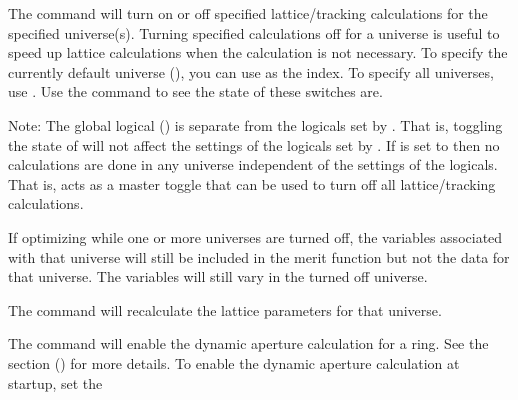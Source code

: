 {{{{{The  command will turn on or off specified lattice/tracking
calculations for the specified universe(s). Turning specified calculations off for a universe is
useful to speed up lattice calculations when the calculation is not necessary. To specify the
currently default universe (), you can use  as the 
index. To specify all universes, use \vn{*}. Use the  command to see the state of
these switches are.

Note: The global logical  () is separate from the logicals set
by . That is, toggling the state of  will not affect the
settings of the logicals set by . If  is set to  then
no calculations are done in any universe independent of the settings of the 
logicals. That is,  acts as a master toggle that can be used to turn off all
lattice/tracking calculations.

If optimizing while one or more universes are turned off, the variables associated with
that universe will still be included in the merit function but not the data for that
universe. The variables will still vary in the turned off universe.

The  command will recalculate the lattice
parameters for that universe.

The  command will enable the dynamic aperture
calculation for a ring. See the  section
() for more details. To enable the dynamic aperture calculation at startup,
set the \vn{design_lattice(i)%

The \vn{set universe <what_universe> one_turn_map_calc} command will enable a one-turn-map
calculation for a ring using PTC, and populate the normal form taylor maps. See
Eq.~\ref{normalform1} and Eq.~\ref{normalform2} in the \vn{normal.} data type. To enable
the map calculation at startup, set the \vn{design_lattice(i)%
(\sref{s:init.lat}).

The commands
\begin{example}
  set universe <what_universe> twiss_calc  and
  set universe <what_universe> track_calc
\end{example}
will set whether the 6x6 transfer matrices and the central orbit (closed orbit for
circular rings) is calculated for a given universe. Turning this off is useful in speeding
up calculations in the case where the transfer matrices and/or orbit is not being used. 

}}}}}}}
